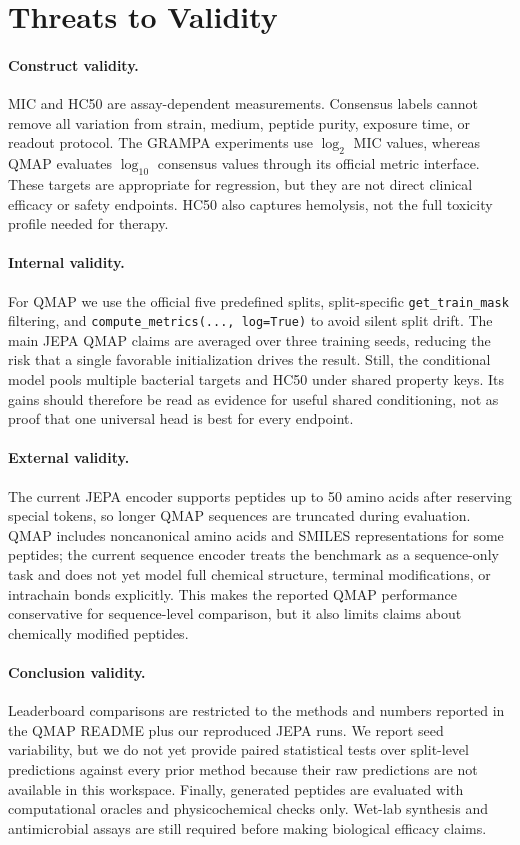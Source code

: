\section{Threats to Validity}
\label{sec:threats}

\paragraph{Construct validity.}
MIC and HC50 are assay-dependent measurements.
Consensus labels cannot remove all variation from strain, medium, peptide purity,
exposure time, or readout protocol.
The GRAMPA experiments use $\log_2$ MIC values, whereas QMAP evaluates
$\log_{10}$ consensus values through its official metric interface.
These targets are appropriate for regression, but they are not direct clinical
efficacy or safety endpoints.
HC50 also captures hemolysis, not the full toxicity profile needed for therapy.

\paragraph{Internal validity.}
For QMAP we use the official five predefined splits, split-specific
\texttt{get\_train\_mask} filtering, and \texttt{compute\_metrics(..., log=True)}
to avoid silent split drift.
The main JEPA QMAP claims are averaged over three training seeds, reducing the
risk that a single favorable initialization drives the result.
Still, the conditional model pools multiple bacterial targets and HC50 under
shared property keys.
Its gains should therefore be read as evidence for useful shared conditioning,
not as proof that one universal head is best for every endpoint.

\paragraph{External validity.}
The current JEPA encoder supports peptides up to 50 amino acids after reserving
special tokens, so longer QMAP sequences are truncated during evaluation.
QMAP includes noncanonical amino acids and SMILES representations for some
peptides; the current sequence encoder treats the benchmark as a sequence-only
task and does not yet model full chemical structure, terminal modifications, or
intrachain bonds explicitly.
This makes the reported QMAP performance conservative for sequence-level
comparison, but it also limits claims about chemically modified peptides.

\paragraph{Conclusion validity.}
Leaderboard comparisons are restricted to the methods and numbers reported in
the QMAP README plus our reproduced JEPA runs.
We report seed variability, but we do not yet provide paired statistical tests
over split-level predictions against every prior method because their raw
predictions are not available in this workspace.
Finally, generated peptides are evaluated with computational oracles and
physicochemical checks only.
Wet-lab synthesis and antimicrobial assays are still required before making
biological efficacy claims.

